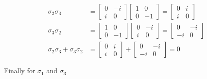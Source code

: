 \documentclass[11pt]{article}
\begin{document}
\begin{enumerate}
\begin{enumerate}
		            \begin{align*}
			            \sigma_2 \sigma_3                     & =
			            \begin{bmatrix} 0 & -i \\ i & 0 \end{bmatrix}
			            \begin{bmatrix} 1 & 0 \\ 0 & -1 \end{bmatrix} =
			            \begin{bmatrix}
				            0 & i \\ i & 0
			            \end{bmatrix}                           \\
			            \sigma_3 \sigma_2                     & =
			            \begin{bmatrix} 1 & 0 \\ 0 & -1 \end{bmatrix}
			            \begin{bmatrix} 0 & -i \\ i & 0 \end{bmatrix} =
			            \begin{bmatrix}
				            0 & -i \\ -i & 0
			            \end{bmatrix}                          \\
			            \sigma_2 \sigma_3 + \sigma_3 \sigma_2 & =
			            \begin{bmatrix}
				            0 & i \\ i & 0
			            \end{bmatrix} +
			            \begin{bmatrix}
				            0 & -i \\ -i & 0
			            \end{bmatrix} = 0
		            \end{align*}

		            Finally for $\sigma_1$ and $\sigma_3$


\end{enumerate}
\end{enumerate}
\end{document}
